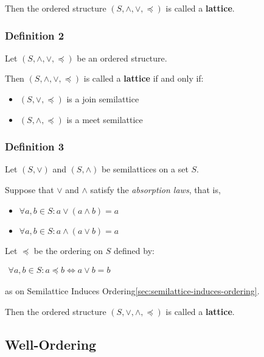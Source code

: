 Then the ordered structure $(S, \wedge, \vee, \preceq)$ is called a
\textbf{lattice}.

\subsubsection{Definition 2}

Let $(S, \wedge, \vee, \preceq)$ be an ordered structure.

Then $(S, \wedge, \vee, \preceq)$ is called a \textbf{lattice} if and
only if:

\begin{itemize}
\item $(S,\vee, \preceq)$ is a join semilattice
\item $(S,\wedge, \preceq)$ is a meet semilattice
\end{itemize}

\subsubsection{Definition 3}

Let $(S, \vee)$ and $(S, \wedge)$ be semilattices on a set $S$.

Suppose that $\vee$ and $\wedge$ satisfy the \textit{absorption laws}, that is,

\begin{itemize}
\item $\forall a, b \in S: a \vee (a \wedge b) = a$
\item $\forall a, b \in S: a \wedge (a \vee b) = a$
\end{itemize}

Let $\preceq$ be the ordering on $S$ defined by:

\begin{math}
  \begin{array}{c}
    \forall a, b \in S: a \preceq b \iff a \vee b = b
  \end{array}
\end{math}

as on Semilattice Induces
Ordering\ref{sec:semilattice-induces-ordering}.

Then the ordered structure $(S, \vee, \wedge, \preceq)$ is called a
\textbf{lattice}.




\subsection{Well-Ordering}

